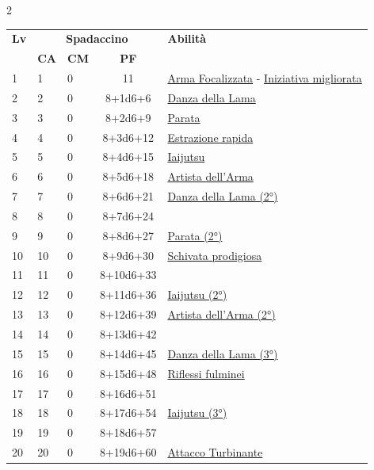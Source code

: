 {\begin{multicols}{2}


\noindent\begin{tabularx}{\linewidth}{p{0.55cm}|p{0.55cm}p{0.55cm}c|X|}
	\toprule
 \rowcolor{gray!20}	\textbf{Lv} & \multicolumn{3}{c|}{\textbf{Spadaccino}} & \textbf{Abilità} \\
& \centering\arraybackslash \textbf{CA} & \centering\arraybackslash \textbf{CM} & \centering\arraybackslash \textbf{PF} & \\
	\toprule
	1 & 1 & 0 & 11 & \hyperlink{Arma Focalizzata}{Arma Focalizzata} - \hyperlink{Iniziativa migliorata}{Iniziativa migliorata}\\
	\rowcolor{gray!20}2 & 2 & 0 & 8+1d6+6 & \hyperlink{Danza della Lama}{Danza della Lama}\\
	3 & 3 & 0 & 8+2d6+9 & \hyperlink{Parata}{Parata}\\
	\rowcolor{gray!20}4 & 4 & 0 & 8+3d6+12 & \hyperlink{Estrazione rapida}{Estrazione rapida}\\
	5 & 5 & 0 & 8+4d6+15 & \hyperlink{Iaijutsu}{Iaijutsu}\\
	\rowcolor{gray!20}6 & 6 & 0 & 8+5d6+18 & \hyperlink{Artista dell'Arma}{Artista dell'Arma}\\
	7 & 7 & 0 & 8+6d6+21 & \hyperlink{Danza della Lama}{Danza della Lama (2°)}\\
	\rowcolor{gray!20}8 & 8 & 0 & 8+7d6+24 & \\
	9 & 9 & 0 & 8+8d6+27 & \hyperlink{Parata}{Parata (2°)}\\
	\rowcolor{gray!20}10 & 10 & 0 & 8+9d6+30 & \hyperlink{Schivata prodigiosa}{Schivata prodigiosa}\\
	11 & 11 & 0 & 8+10d6+33 & \\
	\rowcolor{gray!20}12 & 12 & 0 & 8+11d6+36 & \hyperlink{Iaijutsu}{Iaijutsu (2°)}\\
	13 & 13 & 0 & 8+12d6+39 & \hyperlink{Artista dell'Arma}{Artista dell'Arma (2°)}\\
	\rowcolor{gray!20}14 & 14 & 0 & 8+13d6+42 & \\
	15 & 15 & 0 & 8+14d6+45 & \hyperlink{Danza della Lama}{Danza della Lama (3°)}\\
	\rowcolor{gray!20}16 & 16 & 0 & 8+15d6+48 & \hyperlink{Riflessi fulminei}{Riflessi fulminei}\\
	17 & 17 & 0 & 8+16d6+51 & \\
	\rowcolor{gray!20}18 & 18 & 0 & 8+17d6+54 & \hyperlink{Iaijutsu}{Iaijutsu (3°)}\\
	19 & 19 & 0 & 8+18d6+57 & \\
	\rowcolor{gray!20}20 & 20 & 0 & 8+19d6+60 & \hyperlink{Attacco Turbinante}{Attacco Turbinante}\\
\end{tabularx}


\end{multicols}}

